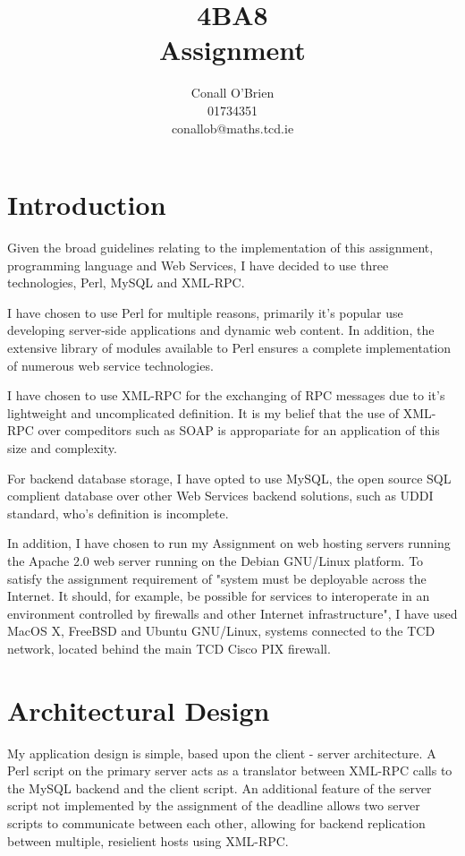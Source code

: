 \documentclass[a4paper,12pt]{article}
\begin{document}
\title{4BA8 \\ Assignment}

\author{Conall O'Brien \\ 01734351 \\ conallob@maths.tcd.ie}

\maketitle

\section{Introduction}

Given the broad guidelines relating to the implementation of this 
assignment,  programming language and Web Services, I have decided to 
use three technologies, Perl, MySQL and XML-RPC.


I have chosen to use Perl for multiple reasons, primarily it's
popular use developing server-side applications and dynamic web content.
In addition, the extensive library of modules available to Perl ensures
a complete implementation of numerous web service technologies.


I have chosen to use XML-RPC for the exchanging of RPC messages due to
it's lightweight and uncomplicated definition. It is my belief that the 
use of XML-RPC over compeditors such as SOAP is appropariate for an
application of this size and complexity.


For backend database storage, I have opted to use MySQL, the open source
SQL complient database over other Web Services backend solutions, such 
as UDDI standard, who's definition is incomplete.


In addition, I have chosen to run my Assignment on web hosting servers
running the Apache 2.0 web server running on the Debian GNU/Linux
platform. To satisfy the assignment requirement of "system must be 
deployable across the Internet. It should, for example, be possible for 
services to interoperate in an environment controlled by firewalls and 
other Internet infrastructure", I have used MacOS X, FreeBSD and Ubuntu 
GNU/Linux, systems connected to the TCD network, located behind the
main TCD Cisco PIX firewall.

\section{Architectural Design}

My application design is simple, based upon the client - server
architecture. A Perl script on the primary server acts as a translator
between XML-RPC calls to the MySQL backend and the client script. An 
additional feature of the server script not implemented by the 
assignment of the deadline allows two server scripts to communicate
between each other, allowing for backend replication between multiple,
resielient hosts using XML-RPC.
\end{document}

